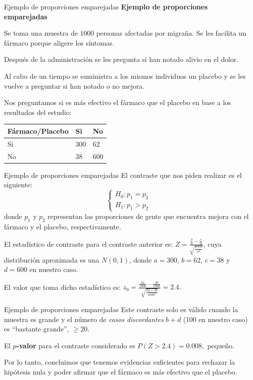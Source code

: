 \documentclass[
  ignorenonframetext,
]{beamer}
\begin{document}
\begin{frame}{Ejemplo de proporciones emparejadas}
\protect\hypertarget{ejemplo-de-proporciones-emparejadas}{}
\textbf{Ejemplo de proporciones emparejadas}

Se toma una muestra de \(1000\) personas afectadas por migraña. Se les
facilita un fármaco porque aligere los síntomas.

Después de la administración se les pregunta si han notado alivio en el
dolor.

Al cabo de un tiempo se suministra a los mismos individuos un placebo y
se les vuelve a preguntar si han notado o no mejora.

Nos preguntamos si es más efectivo el fármaco que el placebo en base a
los resultados del estudio:

\begin{longtable}[]{@{}lll@{}}
\toprule
Fármaco/Placebo & Si & No\tabularnewline
\midrule
\endhead
Si & 300 & 62\tabularnewline
No & 38 & 600\tabularnewline
\bottomrule
\end{longtable}
\end{frame}

\begin{frame}{Ejemplo de proporciones emparejadas}
\protect\hypertarget{ejemplo-de-proporciones-emparejadas-1}{}
El contraste que nos piden realizar es el siguiente: \[
\left\{\begin{array}{l}
H_0:p_1=p_2\\
H_1:p_1> p_2
\end{array}\right.
\] donde \(p_1\) y \(p_2\) representan las proporciones de gente que
encuentra mejora con el fármaco y el placebo, respectivamente.

El estadístico de contraste para el contraste anterior es:
\(Z=\frac{\frac{b}{n}-\frac{c}{n}}{\sqrt{\frac{b+c}{n^2}}}\), cuya
distribución aproximada es una \(N(0,1)\), donde \(a=300\), \(b=62\),
\(c=38\) y \(d=600\) en nuestro caso.

El valor que toma dicho estadístico es:
\(z_0 = \frac{\frac{62}{1000}-\frac{38}{1000}}{\sqrt{\frac{62+38}{1000^2}}} =2.4.\)
\end{frame}

\begin{frame}{Ejemplo de proporciones emparejadas}
\protect\hypertarget{ejemplo-de-proporciones-emparejadas-2}{}
Este contraste solo es válido cuando la muestra es grande y el número de
\emph{casos discordantes} \(b+d\) (100 en nuestro caso) es ``bastante
grande'', \(\geq 20\).

El \textbf{\(p\)-valor} para el contraste considerado es
\(P(Z>2.4)=0.008,\) pequeño.

Por lo tanto, concluimos que tenemos evidencias suficientes para
rechazar la hipótesis nula y poder afirmar que el fármaco es más
efectivo que el placebo.
\end{frame}
\end{document}
